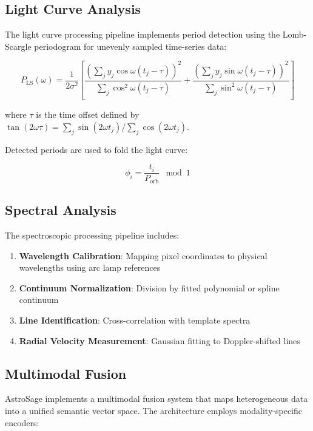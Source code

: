 \documentclass[11pt,a4paper]{article}
\begin{document}
\subsection{Light Curve Analysis}

The light curve processing pipeline implements period detection using the Lomb-Scargle periodogram for unevenly sampled time-series data:

\begin{equation}
    P_{\text{LS}}(\omega) = \frac{1}{2\sigma^2} \left[ \frac{\left(\sum_j y_j \cos \omega(t_j - \tau)\right)^2}{\sum_j \cos^2 \omega(t_j - \tau)} + \frac{\left(\sum_j y_j \sin \omega(t_j - \tau)\right)^2}{\sum_j \sin^2 \omega(t_j - \tau)} \right]
\end{equation}

where $\tau$ is the time offset defined by $\tan(2\omega\tau) = \sum_j \sin(2\omega t_j) / \sum_j \cos(2\omega t_j)$.

Detected periods are used to fold the light curve:

\begin{equation}
    \phi_i = \frac{t_i}{P_{\text{orb}}} \mod 1
\end{equation}

\subsection{Spectral Analysis}

The spectroscopic processing pipeline includes:

\begin{enumerate}
    \item \textbf{Wavelength Calibration}: Mapping pixel coordinates to physical wavelengths using arc lamp references
    \item \textbf{Continuum Normalization}: Division by fitted polynomial or spline continuum
    \item \textbf{Line Identification}: Cross-correlation with template spectra
    \item \textbf{Radial Velocity Measurement}: Gaussian fitting to Doppler-shifted lines
\end{enumerate}

\subsection{Multimodal Fusion}

AstroSage implements a multimodal fusion system that maps heterogeneous data into a unified semantic vector space. The architecture employs modality-specific encoders:
\end{document}
